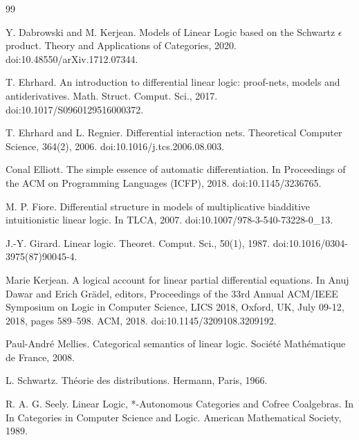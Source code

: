 \begin{thebibliography}{99}
\par\noindent    Y. Dabrowski and M. Kerjean.  Models of Linear Logic based on the Schwartz $\epsilon$ product.  Theory and Applications of Categories, 2020.  doi:10.48550/arXiv.1712.07344.  

\par\noindent    T. Ehrhard.  An introduction to differential linear logic: proof-nets, models and antiderivatives.  Math. Struct. Comput. Sci., 2017.  doi:10.1017/S0960129516000372.  

\par\noindent    T. Ehrhard and L. Regnier.  Differential interaction nets.  Theoretical Computer Science, 364(2), 2006.  doi:10.1016/j.tcs.2006.08.003.  

\par\noindent    Conal Elliott.  The simple essence of automatic differentiation.  In Proceedings of the ACM on Programming Languages (ICFP), 2018.  doi:10.1145/3236765.  

\par\noindent    M. P. Fiore.  Differential structure in models of multiplicative biadditive intuitionistic linear logic.  In TLCA, 2007.  doi:10.1007/978-3-540-73228-0\_13.  

\par\noindent    J.-Y. Girard.  Linear logic.  Theoret. Comput. Sci., 50(1), 1987.  doi:10.1016/0304-3975(87)90045-4.  

\par\noindent    Marie Kerjean.  A logical account for linear partial differential equations.  In Anuj Dawar and Erich Grädel, editors, Proceedings of the 33rd Annual ACM/IEEE Symposium on Logic in Computer Science, LICS 2018, Oxford, UK, July 09-12, 2018, pages 589–598. ACM, 2018.  doi:10.1145/3209108.3209192.  

\par\noindent    Paul-André Mellies.  Categorical semantics of linear logic.  Société Mathématique de France, 2008.  

\par\noindent    L. Schwartz.  Théorie des distributions.  Hermann, Paris, 1966.  

\par\noindent    R. A. G. Seely.  Linear Logic, *-Autonomous Categories and Cofree Coalgebras.  In In Categories in Computer Science and Logic. American Mathematical Society, 1989.  

\end{thebibliography}
